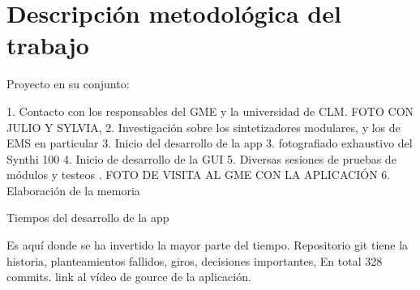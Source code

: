 \chapter{Descripción metodológica del trabajo}




Proyecto en su conjunto:

1. Contacto con los responsables del GME y la universidad de CLM. FOTO CON JULIO Y SYLVIA, 
2. Investigación sobre los sintetizadores modulares, y los de EMS en particular
3. Inicio del desarrollo de la app
3. fotografiado exhaustivo del Synthi 100
4. Inicio de desarrollo de la GUI
5. Diversas sesiones de pruebas de módulos y testeos . FOTO DE VISITA AL GME CON LA APLICACIÓN
6. Elaboración de la memoria



Tiempos del desarrollo de la app

Es aquí donde se ha invertido la mayor parte del tiempo.
Repositorio git tiene la historia, planteamientos fallidos, giros, decisiones importantes, En total 328 commits.
link al vídeo de gource de la aplicación.


